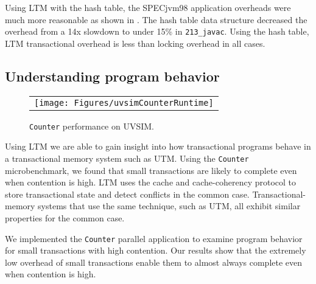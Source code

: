 Using LTM with the hash table, the SPECjvm98 application overheads
were much more reasonable as shown in .  The hash
table data structure decreased the overhead from a 14x slowdown to
under 15\% in \texttt{213\_javac}. Using the hash table, LTM
transactional overhead is less than locking overhead in all cases.


\subsection{Understanding program behavior}

\begin{figure}
\begin{center}
\begin{tabular}{c}
\texttt{[image: Figures/uvsimCounterRuntime]}
\end{tabular}
\end{center}
\caption{\texttt{Counter} performance on UVSIM.}
\label{fig:microbenchperf}
\end{figure}

Using LTM we are able to gain insight into how transactional programs
behave in a transactional memory system such as UTM. Using the
\texttt{Counter} microbenchmark, we found that small transactions are
likely to complete even when contention is high. LTM uses the
cache and cache-coherency protocol to store transactional state and
detect conflicts in the common case. Transactional-memory systems that
use the same technique, such as UTM, all exhibit similar
properties for the common case.

We implemented the \texttt{Counter} parallel application to examine
program behavior for small transactions with high contention. Our
results show that the extremely low overhead of small transactions
enable them to almost always complete even when contention is high.

